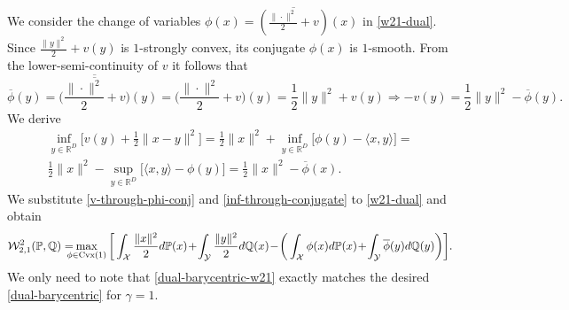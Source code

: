 \documentclass{article} %
\begin{document}
We consider the change of variables $\phi(x)=\overline{(\frac{\|\cdot\|^{2}}{2}+v)}(x)$ in \eqref{w21-dual}. Since $\frac{\|y\|^{2}}{2}+v(y)$ is $1$-strongly convex, its conjugate $\phi(x)$ is $1$-smooth. From the lower-semi-continuity of $v$ it follows that
\begin{equation}
    \overline{\phi}(y)=\overline{\overline{\big(\frac{\|\cdot\|^{2}}{2}+v\big)}}(y)=\big(\frac{\|\cdot\|^{2}}{2}+v\big)(y)=\frac{1}{2}\|y\|^{2}+v(y)\Longrightarrow -v(y)=\frac{1}{2}\|y\|^{2}-\overline{\phi}(y).
    \label{v-through-phi-conj}
\end{equation}
We derive
\begin{eqnarray}
    \inf_{y\in\mathbb{R}^{D}}\big[v(y)+\frac{1}{2}\|x-y\|^{2}\big]=\frac{1}{2}\|x\|^{2}+\inf_{y\in\mathbb{R}^{D}}\big[\phi(y)-\langle x,y\rangle\big]=
    \nonumber
    \\
    \frac{1}{2}\|x\|^{2}-\sup_{y\in\mathbb{R}^{D}}\big[\langle x,y\rangle-\phi(y)\big]=\frac{1}{2}\|x\|^{2}-\overline{\phi}(x).
    \label{inf-through-conjugate}
\end{eqnarray}
We substitute \eqref{v-through-phi-conj} and \eqref{inf-through-conjugate} to \eqref{w21-dual} and obtain
\begin{eqnarray}
\mathcal{W}_{2,1}^{2}(\mathbb{P},\mathbb{Q})=\hspace{-3mm}\max_{\phi\in \text{\normalfont Cvx}(1)}\bigg[\int_{\mathcal{X}} \frac{\|x\|^{2}}{2}d\mathbb{P}(x)\!+\!\int_{\mathcal{Y}}\frac{\|y\|^{2}}{2}d\mathbb{Q}(x)\!-\!\bigg(\int_{\mathcal{X}}\phi(x)d\mathbb{P}(x)\!+\!\int_{\mathcal{Y}}\overline{\phi}(y)d\mathbb{Q}(y)\bigg)\bigg].
\label{dual-barycentric-w21}
\end{eqnarray}
We only need to note that \eqref{dual-barycentric-w21} exactly matches the desired \eqref{dual-barycentric} for $\gamma=1$.
\end{document}
